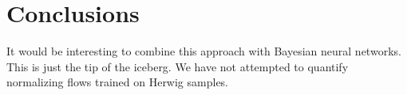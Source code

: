 \section{Conclusions}\label{sec:conclusions}

It would be interesting to combine this approach with Bayesian neural
networks. This is just the tip of the iceberg. We have not attempted to
quantify normalizing flows trained on Herwig samples.

